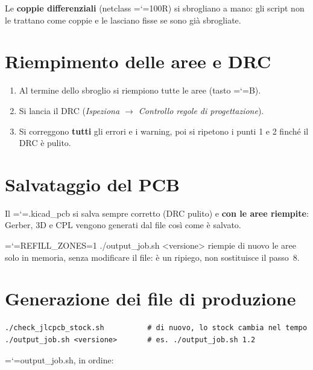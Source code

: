 \documentclass[11pt,a4paper]{article}
\makeatletter
\newcommand{\file}[1]{{\ttfamily\hyphenchar\font=`\-\relax\language=\l@nohyphenation #1}}
\makeatother
\begin{document}
Le \textbf{coppie differenziali} (netclass \file{100R}) si sbrogliano a mano:
gli script non le trattano come coppie e le lasciano fisse se sono già
sbrogliate.

\section{Riempimento delle aree e DRC}

\begin{enumerate}[leftmargin=*]
  \item Al termine dello sbroglio si riempiono tutte le aree (tasto \file{B}).
  \item Si lancia il DRC (\emph{Ispeziona $\rightarrow$ Controllo regole di
        progettazione}).
  \item Si correggono \textbf{tutti} gli errori e i warning, poi si ripetono i
        punti 1 e 2 finché il DRC è pulito.
\end{enumerate}

\section{Salvataggio del PCB}

Il \file{.kicad\_pcb} si salva sempre corretto (DRC pulito) e \textbf{con le
aree riempite}: Gerber, 3D e CPL vengono generati dal file così come è salvato.

\file{REFILL\_ZONES=1 ./output\_job.sh <versione>} riempie di nuovo le aree solo
in memoria, senza modificare il file: è un ripiego, non sostituisce il passo~8.

\section{Generazione dei file di produzione}

\begin{lstlisting}[style=shell]
./check_jlcpcb_stock.sh          # di nuovo, lo stock cambia nel tempo
./output_job.sh <versione>       # es. ./output_job.sh 1.2
\end{lstlisting}

\file{output\_job.sh}, in ordine:
\end{document}
